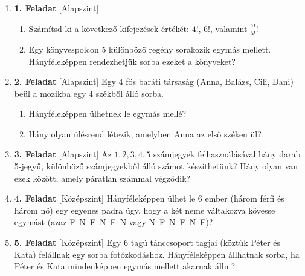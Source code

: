 \documentclass[12pt,a4paper]{article}
\begin{document}
\begin{enumerate}
    
    \item \textbf{1. Feladat} \textsf{\small [Alapszint]}
    \begin{enumerate}[label=\alph*)]
        \item Számítsd ki a következő kifejezések értékét: $4!$, $6!$, valamint $\frac{7!}{5!}$!
        \item Egy könyvespolcon 5 különböző regény sorakozik egymás mellett. Hányféleképpen rendezhetjük sorba ezeket a könyveket?
    \end{enumerate}

    \vspace{0.3cm}

    \item \textbf{2. Feladat} \textsf{\small [Alapszint]}
    Egy 4 fős baráti társaság (Anna, Balázs, Cili, Dani) beül a mozikba egy 4 székből álló sorba.
    \begin{enumerate}[label=\alph*)]
        \item Hányféleképpen ülhetnek le egymás mellé?
        \item Hány olyan ülésrend létezik, amelyben Anna az első széken ül?
    \end{enumerate}

    \vspace{0.3cm}

    \item \textbf{3. Feladat} \textsf{\small [Alapszint]}
    Az $1, 2, 3, 4, 5$ számjegyek felhasználásával hány darab 5-jegyű, különböző számjegyekből álló számot készíthetünk? Hány olyan van ezek között, amely páratlan számmal végződik?

    \vspace{0.3cm}

    \item \textbf{4. Feladat} \textsf{\small [Középszint]}
    Hányféleképpen ülhet le 6 ember (három férfi és három nő) egy egyenes padra úgy, hogy a két neme váltakozva kövesse egymást (azaz F--N--F--N--F--N vagy N--F--N--F--N--F)?

    \vspace{0.3cm}

    \item \textbf{5. Feladat} \textsf{\small [Középszint]}
    Egy 6 tagú tánccsoport tagjai (köztük Péter és Kata) felállnak egy sorba fotózkodáshoz. Hányféleképpen állhatnak sorba, ha Péter és Kata mindenképpen egymás mellett akarnak állni?


\end{enumerate}
\end{document}
